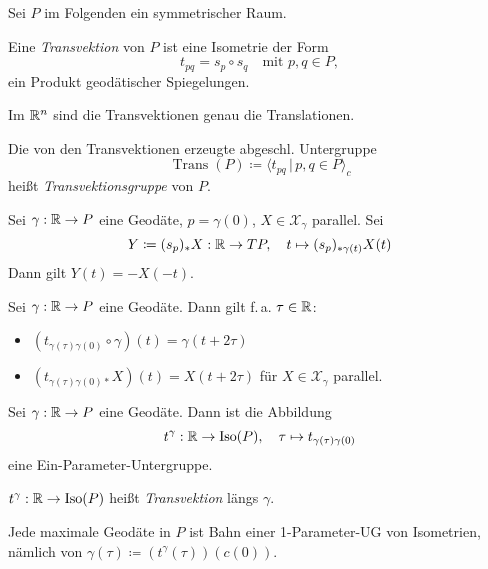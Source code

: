 \documentclass{cheat-sheet}
\DeclareMathOperator{\Iso}{Iso} %
\DeclareMathOperator{\Trans}{Trans} %
\newcommand{\VF}{\mathcal{X}} %
\begin{document}
\begin{nota}
  Sei $P$ im Folgenden ein symmetrischer Raum.
\end{nota}

\begin{defn}
  Eine \emph{Transvektion} von $P$ ist eine Isometrie der Form
  \[ t_{pq} = s_p \circ s_q \quad \text{mit } p, q \in P, \]
  \dh{} ein Produkt geodätischer Spiegelungen.
\end{defn}

\begin{bsp}
  Im $\mathbb{R}^n$ sind die Transvektionen genau die Translationen.
\end{bsp}

\begin{defn}
  Die von den Transvektionen erzeugte abgeschl. Untergruppe
  \[ \Trans(P) \coloneqq \langle t_{pq} \,|\, p, q \in P \rangle_{c} \]
  heißt \emph{Transvektionsgruppe} von $P$.
\end{defn}

\begin{lem}
  Sei $\gamma : \mathbb{R} \to P$ eine Geodäte, $p = \gamma(0)$, $X \in \VF_\gamma$ parallel. Sei
  \[
    Y \coloneqq (s_p)_* X : \mathbb{R} \to TP, \quad
    t \mapsto (s_p)_{*\gamma(t)} X(t)
  \]
  Dann gilt $Y(t) = -X(-t)$.
\end{lem}

\begin{lem}
  Sei $\gamma : \mathbb{R} \to P$ eine Geodäte. Dann gilt f.\,a. $\tau \in \mathbb{R}$:
  \begin{itemize}
    \item $(t_{\gamma(\tau)\gamma(0)} \circ \gamma)(t) = \gamma(t + 2\tau)$
    \item $(t_{\gamma(\tau)\gamma(0)*} X)(t) = X(t + 2 \tau)$ für $X \in \VF_\gamma$ parallel.
  \end{itemize}
\end{lem}

\begin{lem}
  Sei $\gamma : \mathbb{R} \to P$ eine Geodäte. Dann ist die Abbildung
  \[
    t^\gamma : \R \to \Iso(P), \quad
    \tau \mapsto t_{\gamma(\tau)\gamma(0)}
  \]
  eine Ein-Parameter-Untergruppe.
\end{lem}

\begin{defn}
  $t^\gamma : \R \to \Iso(P)$ heißt \emph{Transvektion} längs $\gamma$.
\end{defn}

\begin{satz}
  Jede maximale Geodäte in $P$ ist Bahn einer 1-Parameter-UG von Isometrien, nämlich von $\gamma(\tau) \coloneqq (t^\gamma(\tau))(c(0))$.
\end{satz}
\end{document}
